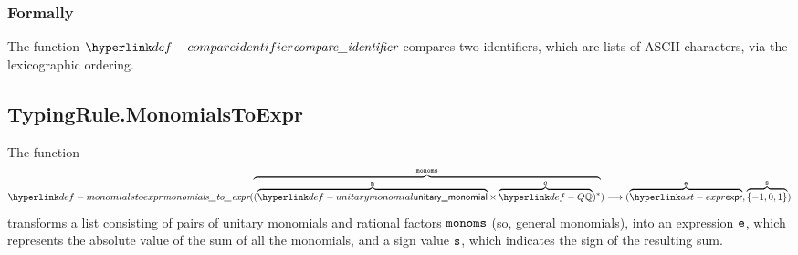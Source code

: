 \subsubsection{Formally}
\hypertarget{def-compareidentifier}{}
The function $\compareidentifier$ compares two identifiers, which are lists of ASCII characters,
via the lexicographic ordering.


\subsection{TypingRule.MonomialsToExpr \label{sec:TypingRule.MonomialsToExpr}}
\hypertarget{def-monomialstoexpr}{}
The function
\[
\monomialstoexpr(\overname{(\overname{\unitarymonomial}{\vm}\times\overname{\Q}{q})^*}{\monoms}) \aslto
(\overname{\expr}{\ve},\overname{\{-1,0,1\}}{\vs})
\]
transforms a list consisting of pairs of unitary monomials and rational factors $\texttt{monoms}$ (so, general monomials),
into an expression $\texttt{e}$, which represents the absolute value of the sum of all the monomials,
and a sign value $\texttt{s}$, which indicates the sign of the resulting sum.

